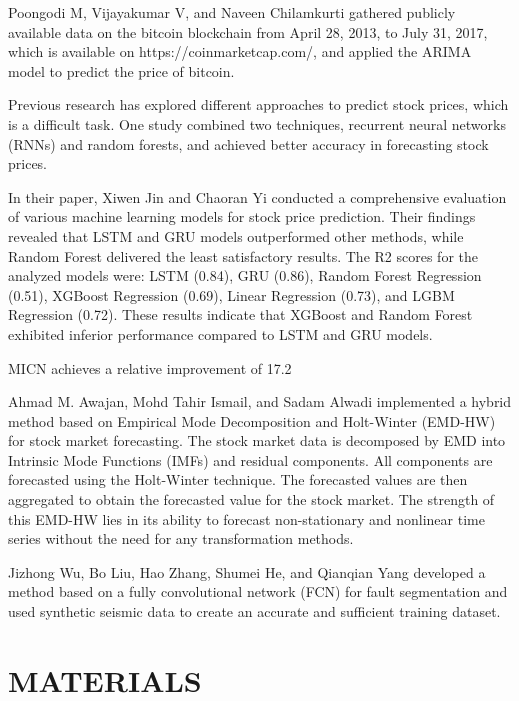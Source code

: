 \documentclass[conference]{IEEEtran}
\begin{document}
Poongodi M, Vijayakumar V, and Naveen Chilamkurti gathered publicly available data on the bitcoin blockchain from April 28, 2013, to July 31, 2017, which is available on https://coinmarketcap.com/, and applied the ARIMA model to predict the price of bitcoin.

Previous research has explored different approaches to predict stock prices, which is a difficult task. One study combined two techniques, recurrent neural networks (RNNs) and random forests, and achieved better accuracy in forecasting stock prices.

In their paper, Xiwen Jin and Chaoran Yi conducted a comprehensive evaluation of various machine learning models for stock price prediction. Their findings revealed that LSTM and GRU models outperformed other methods, while Random Forest delivered the least satisfactory results. The R2 scores for the analyzed models were: LSTM (0.84), GRU (0.86), Random Forest Regression (0.51), XGBoost Regression (0.69), Linear Regression (0.73), and LGBM Regression (0.72). These results indicate that XGBoost and Random Forest exhibited inferior performance compared to LSTM and GRU models.

MICN achieves a relative improvement of 17.2%

Ahmad M. Awajan, Mohd Tahir Ismail, and Sadam Alwadi implemented a hybrid method based on Empirical Mode Decomposition and Holt-Winter (EMD-HW) for stock market forecasting. The stock market data is decomposed by EMD into Intrinsic Mode Functions (IMFs) and residual components. All components are forecasted using the Holt-Winter technique. The forecasted values are then aggregated to obtain the forecasted value for the stock market. The strength of this EMD-HW lies in its ability to forecast non-stationary and nonlinear time series without the need for any transformation methods.

Jizhong Wu, Bo Liu, Hao Zhang, Shumei He, and Qianqian Yang developed a method based on a fully convolutional network (FCN) for fault segmentation and used synthetic seismic data to create an accurate and sufficient training dataset.

\section{MATERIALS}
\end{document}

